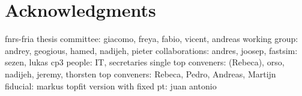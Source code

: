 \chapter*{Acknowledgments}

fnrs-fria
thesis committee: giacomo, freya, fabio, vicent, andreas
working group: andrey, geogious, hamed, nadijeh, pieter
collaborations: andres, joosep, 
fastsim: sezen, lukas
cp3 people: IT, secretaries
single top conveners: (Rebeca), orso, nadijeh, jeremy, thorsten
top conveners:  Rebeca, Pedro, Andreas, Martijn
fiducial: markus
topfit version with fixed pt: juan antonio

